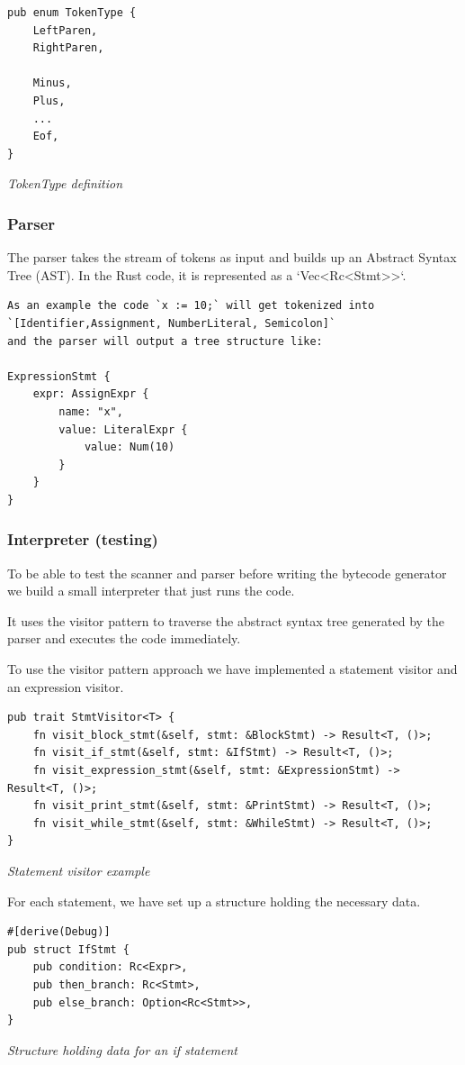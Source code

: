 \documentclass{article}
\begin{document}
\begin{verbatim}
pub enum TokenType {
    LeftParen,
    RightParen,

    Minus,
    Plus,
    ...
    Eof,
}
\end{verbatim}
\textit{TokenType definition}

\subsubsection{Parser}
The parser takes the stream of tokens as input and builds up an Abstract Syntax
Tree (AST). In the Rust code, it is represented as a `Vec<Rc<Stmt>>`.

\begin{verbatim}
As an example the code `x := 10;` will get tokenized into 
`[Identifier,Assignment, NumberLiteral, Semicolon]` 
and the parser will output a tree structure like:

ExpressionStmt {
    expr: AssignExpr {
        name: "x",
        value: LiteralExpr {
            value: Num(10)
        }
    }
}
\end{verbatim}

\subsubsection{Interpreter (testing)}
To be able to test the scanner and parser before writing the bytecode generator
we build a small interpreter that just runs the code.

It uses the visitor pattern to traverse the abstract syntax tree generated by
the parser and executes the code immediately.

To use the visitor pattern approach we have implemented a statement visitor and
an expression visitor.

\begin{verbatim}
pub trait StmtVisitor<T> {
    fn visit_block_stmt(&self, stmt: &BlockStmt) -> Result<T, ()>;
    fn visit_if_stmt(&self, stmt: &IfStmt) -> Result<T, ()>;
    fn visit_expression_stmt(&self, stmt: &ExpressionStmt) -> Result<T, ()>;
    fn visit_print_stmt(&self, stmt: &PrintStmt) -> Result<T, ()>;
    fn visit_while_stmt(&self, stmt: &WhileStmt) -> Result<T, ()>;
}
\end{verbatim}
\textit{Statement visitor example}

For each statement, we have set up a structure holding the necessary data.

\begin{verbatim}
#[derive(Debug)]
pub struct IfStmt {
    pub condition: Rc<Expr>,
    pub then_branch: Rc<Stmt>,
    pub else_branch: Option<Rc<Stmt>>,
}
\end{verbatim}
\textit{Structure holding data for an if statement}
\end{document}
